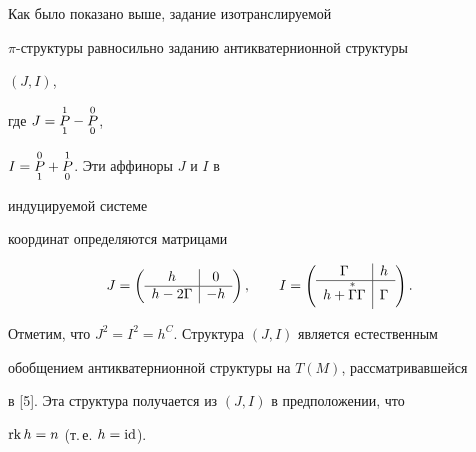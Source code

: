 \begin{note} Как было показано выше, задание изотранслируемой


$\pi$-структуры равносильно заданию антикватернионной структуры


$(J,I)$,


где $J=\overset{1}{\underset{1}{P}}{}-\overset{0}{\underset{0}{P}}{}$,


$I=\overset{0}{\underset{1}{P}}{}+\overset{1}{\underset{0}{P}}{}$. Эти аффиноры $J$ и $I$ в


индуцируемой системе


координат определяются матрицами


\begin{equation}


J=


\left(


\begin{array}{c|c}


h & 0 \\


\hline


h-2\Gamma & -h


\end{array}


\right)


,\qquad


I=


\left(


\begin{array}{c|c}


\Gamma & h \\


\hline


h+\updown{*}{}{\Gamma}\Gamma & \Gamma


\end{array}


\right)


.


\end{equation}


Отметим, что $J^2=I^2=h^C$. Структура $(J,I)$ является естественным


обобщением антикватернионной структуры на $T(M)$, рассматривавшейся


в [5]. Эта структура получается из $(J,I)$ в предположении, что


$\operatorname{rk} h=n$ (т.\,е. $h=\operatorname{id}$).


\end{note}





